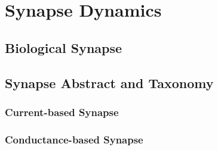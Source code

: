
\chapter{Synapse Dynamics}
\section{Biological Synapse}

\section{Synapse Abstract and Taxonomy}


\subsection{Current-based Synapse}


\subsection{Conductance-based Synapse}

